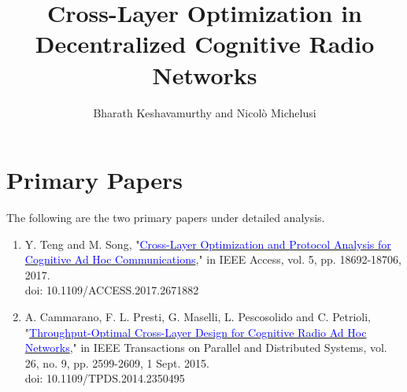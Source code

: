\documentclass[12pt, draftcls, onecolumn]{IEEEtran}
\begin{document}
 
\title{Cross-Layer Optimization in Decentralized Cognitive Radio Networks}
\author{Bharath Keshavamurthy and Nicol\`{o} Michelusi}
\maketitle
{}
\section{Primary Papers}
The following are the two primary papers under detailed analysis.
\begin{enumerate}
    \item Y. Teng and M. Song, "\href{http://ieeexplore.ieee.org/stamp/stamp.jsp?tp=&arnumber=7859326&isnumber=7859429}{\textcolor{blue}{Cross-Layer Optimization and Protocol Analysis for Cognitive Ad Hoc Communications}}," in IEEE Access, vol. 5, pp. 18692-18706, 2017.
    \\doi: 10.1109/ACCESS.2017.2671882
    \item A. Cammarano, F. L. Presti, G. Maselli, L. Pescosolido and C. Petrioli, "\href{http://ieeexplore.ieee.org/stamp/stamp.jsp?tp=&arnumber=6881740&isnumber=7180482}{\textcolor{blue}{Throughput-Optimal Cross-Layer Design for Cognitive Radio Ad Hoc Networks}}," in IEEE Transactions on Parallel and Distributed Systems, vol. 26, no. 9, pp. 2599-2609, 1 Sept. 2015.
    \\doi: 10.1109/TPDS.2014.2350495
\end{enumerate}
\end{document}
